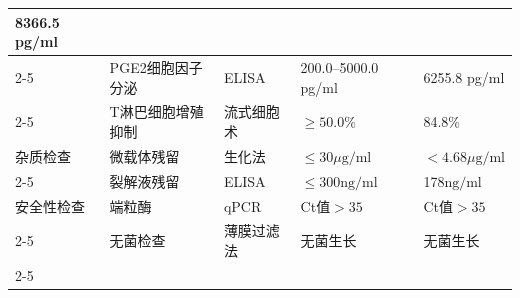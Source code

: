 \documentclass[UTF8,10pt,a4paper,fontset=fandol]{ctexart}
\newcommand{\fieldvalue}[1]{#1}
\begin{document}
\begin{tabularx}{\textwidth}{|p{2.2cm}|p{3.0cm}|p{2.7cm}|X|X|}
\fieldvalue{8366.5 pg/ml}
\\ \cline{2-5}
&
\fieldvalue{PGE2细胞因子分泌}
&
\fieldvalue{ELISA}
&
\fieldvalue{200.0--5000.0 pg/ml}
&
\fieldvalue{6255.8 pg/ml}
\\ \cline{2-5}
&
\fieldvalue{T淋巴细胞增殖抑制}
&
\fieldvalue{流式细胞术}
&
\fieldvalue{$\geq 50.0\%$}
&
\fieldvalue{84.8\%}
\\ \hline
\fieldvalue{杂质检查}
&
\fieldvalue{微载体残留}
&
\fieldvalue{生化法}
&
\fieldvalue{$\leq 30\mu\mathrm{g}/\mathrm{ml}$}
&
\fieldvalue{$<4.68\mu\mathrm{g}/\mathrm{ml}$}
\\ \cline{2-5}
&
\fieldvalue{裂解液残留}
&
\fieldvalue{ELISA}
&
\fieldvalue{$\leq 300\mathrm{ng}/\mathrm{ml}$}
&
\fieldvalue{178$\mathrm{ng}/\mathrm{ml}$}
\\ \hline
\fieldvalue{安全性检查}
&
\fieldvalue{端粒酶}
&
\fieldvalue{qPCR}
&
\fieldvalue{Ct值$>35$}
&
\fieldvalue{Ct值$>35$}
\\ \cline{2-5}
&
\fieldvalue{无菌检查}
&
\fieldvalue{薄膜过滤法}
&
\fieldvalue{无菌生长}
&
\fieldvalue{无菌生长}
\\ \cline{2-5}
&

\end{tabularx}
\end{document}
